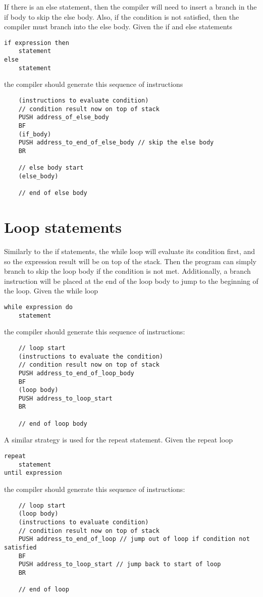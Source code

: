 \documentclass{article}
\begin{document}
\noindent
If there is an else statement, then the compiler will need to insert a branch in the if body to skip the else body. Also, if the condition is not satisfied, then the compiler must branch into the else body.
\newline
Given the if and else statements
\begin{lstlisting}
if expression then
    statement
else
    statement
\end{lstlisting}
the compiler should generate this sequence of instructions
\begin{lstlisting}
    (instructions to evaluate condition)
    // condition result now on top of stack
    PUSH address_of_else_body
    BF
    (if_body)
    PUSH address_to_end_of_else_body // skip the else body
    BR
    
    // else body start
    (else_body)
    
    // end of else body
\end{lstlisting}

\newpage
\section{Loop statements}
Similarly to the if statements, the while loop will evaluate its condition first, and so the expression result will be on top of the stack. Then the program can simply branch to skip the loop body if the condition is not met. Additionally, a branch instruction will be placed at the end of the loop body to jump to the beginning of the loop.
\newline
\newline
Given the while loop
\begin{lstlisting}
while expression do
    statement
\end{lstlisting}
the compiler should generate this sequence of instructions:
\begin{lstlisting}
    // loop start
    (instructions to evaluate the condition)
    // condition result now on top of stack
    PUSH address_to_end_of_loop_body
    BF
    (loop body)
    PUSH address_to_loop_start
    BR
    
    // end of loop body
\end{lstlisting}
\newline
A similar strategy is used for the repeat statement.
\newline
Given the repeat loop
\begin{lstlisting}
repeat
    statement
until expression
\end{lstlisting}
the compiler should generate this sequence of instructions:
\begin{lstlisting}
    // loop start
    (loop body)
    (instructions to evaluate condition)
    // condition result now on top of stack
    PUSH address_to_end_of_loop // jump out of loop if condition not satisfied
    BF
    PUSH address_to_loop_start // jump back to start of loop
    BR
    
    // end of loop
\end{lstlisting}
\end{document}
